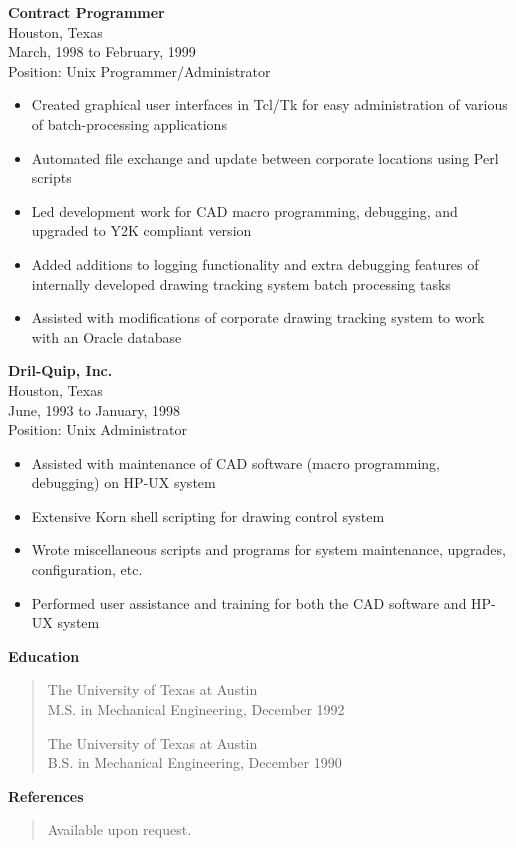 \documentclass[10pt]{article}
\begin{document}
\textbf{Contract Programmer}\\
Houston, Texas\\
March, 1998 to February, 1999\\
Position: Unix Programmer/Administrator

\begin{itemize}
\item Created graphical user interfaces in Tcl/Tk for easy administration of
various of batch-processing applications
\item Automated file exchange and update between corporate locations using Perl scripts
\item Led development work for CAD macro programming, debugging, and upgraded to Y2K compliant version
\item Added additions to logging functionality and extra debugging features of internally developed drawing tracking system batch processing tasks
\item Assisted with modifications of corporate drawing tracking system to work with an Oracle database
\end{itemize}

\textbf{Dril-Quip, Inc.}\\
Houston, Texas\\
June, 1993 to January, 1998\\
Position:  Unix Administrator

\begin{itemize}
\item Assisted with maintenance of CAD software (macro programming, debugging) on HP-UX system
\item Extensive Korn shell scripting for drawing control system
\item Wrote miscellaneous scripts and programs for system maintenance, upgrades, configuration, etc.
\item Performed user assistance and training for both the CAD software and HP-UX system
\end{itemize}

\textbf{\large Education}

\begin{quote}
\setlength{\baselineskip}{5pt}
The University of Texas at Austin\\
M.S. in Mechanical Engineering, December 1992

The University of Texas at Austin\\
B.S. in Mechanical Engineering, December 1990
\end{quote}

\textbf{\large References}

\begin{quote}
\setlength{\baselineskip}{5pt}
Available upon request.
\end{quote}
\end{document}
